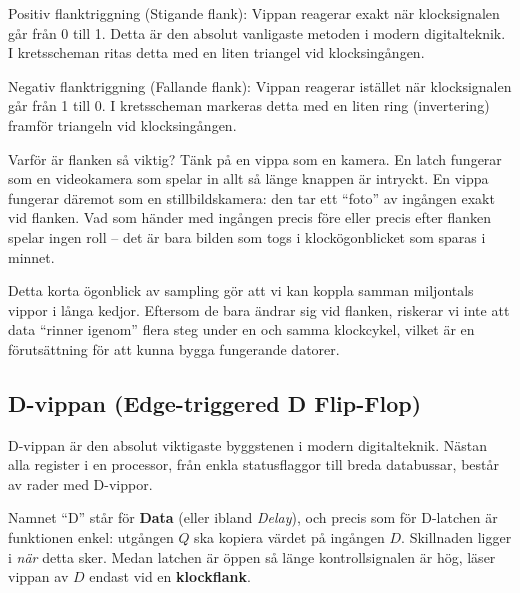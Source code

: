 \documentclass[
  swedish,
  letterpaper,
  oneside,
  openany]{book}
\begin{document}
Positiv flanktriggning (Stigande flank): Vippan reagerar exakt när
klocksignalen går från 0 till 1. Detta är den absolut vanligaste metoden
i modern digitalteknik. I kretsscheman ritas detta med en liten triangel
vid klocksingången.

Negativ flanktriggning (Fallande flank): Vippan reagerar istället när
klocksignalen går från 1 till 0. I kretsscheman markeras detta med en
liten ring (invertering) framför triangeln vid klocksingången.

\begin{tcolorbox}[enhanced jigsaw, arc=.35mm, bottomrule=.15mm, bottomtitle=1mm, breakable, colback=white, colbacktitle=quarto-callout-tip-color!10!white, colframe=quarto-callout-tip-color-frame, coltitle=black, left=2mm, leftrule=.75mm, opacityback=0, opacitybacktitle=0.6, rightrule=.15mm, title=\textcolor{quarto-callout-tip-color}{\faLightbulb}\hspace{0.5em}{Tips}, titlerule=0mm, toprule=.15mm, toptitle=1mm]

Varför är flanken så viktig? Tänk på en vippa som en kamera. En latch
fungerar som en videokamera som spelar in allt så länge knappen är
intryckt. En vippa fungerar däremot som en stillbildskamera: den tar ett
``foto'' av ingången exakt vid flanken. Vad som händer med ingången
precis före eller precis efter flanken spelar ingen roll -- det är bara
bilden som togs i klockögonblicket som sparas i minnet.

\end{tcolorbox}

Detta korta ögonblick av sampling gör att vi kan koppla samman
miljontals vippor i långa kedjor. Eftersom de bara ändrar sig vid
flanken, riskerar vi inte att data ``rinner igenom'' flera steg under en
och samma klockcykel, vilket är en förutsättning för att kunna bygga
fungerande datorer.

\subsection{D-vippan (Edge-triggered D
Flip-Flop)}\label{d-vippan-edge-triggered-d-flip-flop}

D-vippan är den absolut viktigaste byggstenen i modern digitalteknik.
Nästan alla register i en processor, från enkla statusflaggor till breda
databussar, består av rader med D-vippor.

Namnet ``D'' står för \textbf{Data} (eller ibland \emph{Delay}), och
precis som för D-latchen är funktionen enkel: utgången \(Q\) ska kopiera
värdet på ingången \(D\). Skillnaden ligger i \emph{när} detta sker.
Medan latchen är öppen så länge kontrollsignalen är hög, läser vippan av
\(D\) endast vid en \textbf{klockflank}.
\end{document}
